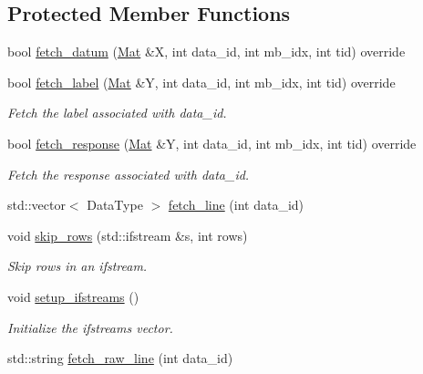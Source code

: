 \subsection*{Protected Member Functions}
\begin{DoxyCompactItemize}
\item 
bool \hyperlink{classlbann_1_1csv__reader_a1fbac4ff1c24ec7f41f55fc8a43515c6}{fetch\+\_\+datum} (\hyperlink{base_8hpp_a68f11fdc31b62516cb310831bbe54d73}{Mat} \&X, int data\+\_\+id, int mb\+\_\+idx, int tid) override
\item 
bool \hyperlink{classlbann_1_1csv__reader_a0c223375a08ed0b6a3a1fcc03c86c4ac}{fetch\+\_\+label} (\hyperlink{base_8hpp_a68f11fdc31b62516cb310831bbe54d73}{Mat} \&Y, int data\+\_\+id, int mb\+\_\+idx, int tid) override
\begin{DoxyCompactList}\small\item\em Fetch the label associated with data\+\_\+id. \end{DoxyCompactList}\item 
bool \hyperlink{classlbann_1_1csv__reader_ab4bbc1b0a9982595b89a930cc125b40b}{fetch\+\_\+response} (\hyperlink{base_8hpp_a68f11fdc31b62516cb310831bbe54d73}{Mat} \&Y, int data\+\_\+id, int mb\+\_\+idx, int tid) override
\begin{DoxyCompactList}\small\item\em Fetch the response associated with data\+\_\+id. \end{DoxyCompactList}\item 
std\+::vector$<$ Data\+Type $>$ \hyperlink{classlbann_1_1csv__reader_acd3af11382da3057c3e72c46bf65f5d3}{fetch\+\_\+line} (int data\+\_\+id)
\item 
void \hyperlink{classlbann_1_1csv__reader_ace1c71ad266e6bd85573051ff45277ab}{skip\+\_\+rows} (std\+::ifstream \&s, int rows)
\begin{DoxyCompactList}\small\item\em Skip rows in an ifstream. \end{DoxyCompactList}\item 
void \hyperlink{classlbann_1_1csv__reader_afc689f206192339770ee9fbd132492bb}{setup\+\_\+ifstreams} ()
\begin{DoxyCompactList}\small\item\em Initialize the ifstreams vector. \end{DoxyCompactList}\item 
std\+::string \hyperlink{classlbann_1_1csv__reader_a8ea8669ec6c85de8d4127da7bb47d135}{fetch\+\_\+raw\+\_\+line} (int data\+\_\+id)
\end{DoxyCompactItemize}
